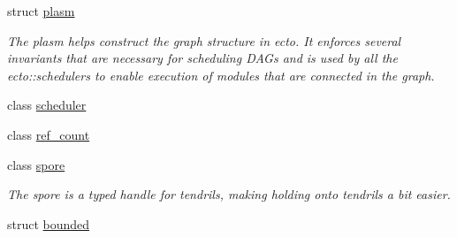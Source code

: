 \begin{DoxyCompactItemize}
struct \hyperlink{structecto_1_1plasm}{plasm}
\begin{DoxyCompactList}\small\item\em The plasm helps construct the graph structure in ecto. It enforces several invariants that are necessary for scheduling D\-A\-Gs and is used by all the ecto\-::schedulers to enable execution of modules that are connected in the graph. \end{DoxyCompactList}\item 
class \hyperlink{classecto_1_1scheduler}{scheduler}
\item 
class \hyperlink{classecto_1_1ref__count}{ref\-\_\-count}
\item 
class \hyperlink{structecto_1_1spore}{spore}
\begin{DoxyCompactList}\small\item\em The spore is a typed handle for tendrils, making holding onto tendrils a bit easier. \end{DoxyCompactList}\item 
struct \hyperlink{structecto_1_1bounded}{bounded}
\end{DoxyCompactItemize}
